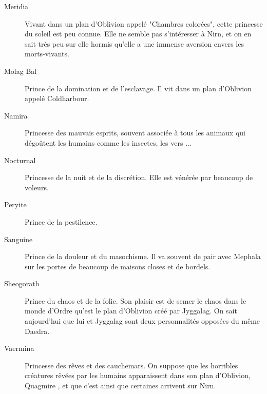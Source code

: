 \begin{description}
{}
\item[Meridia]
{
  Vivant dans un plan d'Oblivion appelé "Chambres colorées", cette princesse du soleil est peu connue. Elle ne semble pas s'intéresser à Nirn, et on en sait très peu sur elle hormis qu'elle a une immense aversion envers les morts-vivants.
}
\item[Molag Bal]
{
  Prince de la domination et de l'esclavage. Il vit dans un plan d'Oblivion appelé Coldharbour.
}
\item[Namira]
{
  Princesse des mauvais esprits, souvent associée à tous les animaux qui dégoûtent les humains comme les insectes, les vers ...
}
\item[Nocturnal]
{
  Princesse de la nuit et de la discrétion. Elle est vénérée par beaucoup de voleurs.
}
\item[Peryite]
{
  Prince de la pestilence.
}
\item[Sanguine]
{
  Prince de la douleur et du masochisme. Il va souvent de pair avec Mephala sur les portes de beaucoup de maisons closes et de bordels.
}
\item[Sheogorath]
{
  Prince du chaos et de la folie. Son plaisir est de semer le chaos dans le monde d'Ordre qu'est le plan d'Oblivion créé par Jyggalag. On sait aujourd'hui que lui et Jyggalag sont deux personnalités opposées du même Daedra.
}
\item[Vaermina]
{
  Princesse des rêves et des cauchemars. On suppose que les horribles créatures rêvées par les humains apparaissent dans son plan d'Oblivion, Quagmire , et que c'est ainsi que certaines arrivent sur Nirn.
}
\end{description}
